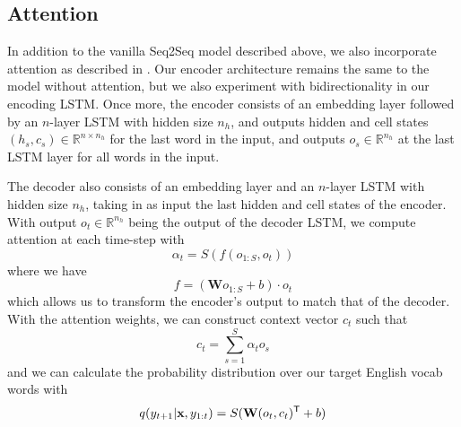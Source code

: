 \documentclass[11pt]{article}
\begin{document}
\subsection{Attention}
In addition to the vanilla Seq2Seq model described above, we also incorporate attention as described in \cite{DBLP:journals/corr/BahdanauCB14}. Our encoder architecture remains the same to the model without attention, but we also experiment with bidirectionality in our encoding LSTM. Once more, the encoder consists of an embedding layer followed by an $n$-layer LSTM with hidden size $n_h$, and outputs hidden and cell states $(h_s, c_s) \in \mathbb{R}^{n \times n_h}$ for the last word in the input, and outputs $o_s \in \mathbb{R}^{n_h}$ at the last LSTM layer for all words in the input.

The decoder also consists of an embedding layer and an $n$-layer LSTM with hidden size $n_h$, taking in as input the last hidden and cell states of the encoder. With output $o_t \in \mathbb{R}^{n_h}$ being the output of the decoder LSTM, we compute attention at each time-step with
\[
\alpha_t = S(f(o_{1:S}, o_t))
\]
where we have
\[
f = (\textbf{W} o_{1:S} + b) \cdot o_t
\]
which allows us to transform the encoder's output to match that of the decoder. With the attention weights, we can construct context vector $c_t$ such that
\[
c_t = \sum_{s=1}^S \alpha_{t}o_s
\]
and we can calculate the probability distribution over our target English vocab words with
\[
q(y_{t+1} | \textbf{x}, y_{1:t}) = S(\mathbf{W}(o_t, c_t)^{\mathsf{T}} + b)
\]
\end{document}
